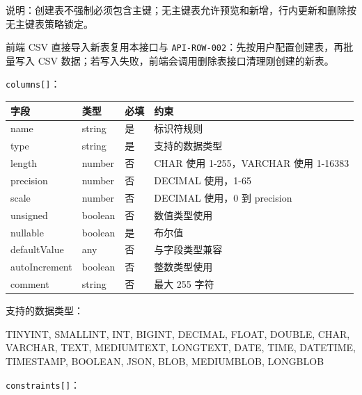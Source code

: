 \documentclass[
  a4paper,
  UTF8]{ctexart}
\newenvironment{Shaded}{}{}
\newcommand{\NormalTok}[1]{#1}
\begin{document}
说明：创建表不强制必须包含主键；无主键表允许预览和新增，行内更新和删除按无主键表策略锁定。

前端 CSV 直接导入新表复用本接口与
\texttt{API-ROW-002}：先按用户配置创建表，再批量写入 CSV
数据；若写入失败，前端会调用删除表接口清理刚创建的新表。

\texttt{columns{[}{]}}：

\begin{longtable}[]{@{}llll@{}}
\toprule
字段 & 类型 & 必填 & 约束 \\
\midrule
\endhead
name & string & 是 & 标识符规则 \\
type & string & 是 & 支持的数据类型 \\
length & number & 否 & CHAR 使用 1-255，VARCHAR 使用 1-16383 \\
precision & number & 否 & DECIMAL 使用，1-65 \\
scale & number & 否 & DECIMAL 使用，0 到 precision \\
unsigned & boolean & 否 & 数值类型使用 \\
nullable & boolean & 是 & 布尔值 \\
defaultValue & any & 否 & 与字段类型兼容 \\
autoIncrement & boolean & 否 & 整数类型使用 \\
comment & string & 否 & 最大 255 字符 \\
\bottomrule
\end{longtable}

支持的数据类型：

\begin{Shaded}
\begin{Highlighting}[]
\NormalTok{TINYINT, SMALLINT, INT, BIGINT, DECIMAL, FLOAT, DOUBLE,}
\NormalTok{CHAR, VARCHAR, TEXT, MEDIUMTEXT, LONGTEXT,}
\NormalTok{DATE, TIME, DATETIME, TIMESTAMP, BOOLEAN, JSON,}
\NormalTok{BLOB, MEDIUMBLOB, LONGBLOB}
\end{Highlighting}
\end{Shaded}

\texttt{constraints{[}{]}}：
\end{document}
